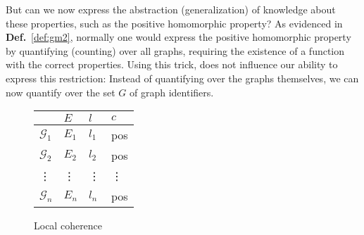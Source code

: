 \documentclass{article}
\theoremstyle{definition}
\newcommand{\graph}[1]{\ensuremath{\mathcal{#1}}}
\begin{document}

But can we now express the abstraction (generalization) of knowledge about these properties, such as the positive homomorphic property?
As evidenced in \textbf{Def.}~\ref{def:gm2}, normally one would express the positive homomorphic property by quantifying (counting) over all graphs, requiring the existence of a function with the correct properties.
Using this trick, does not influence our ability to express this restriction: Instead of quantifying over the graphs themselves, we can now quantify over the set $G$ of graph identifiers.

\begin{figure}[h]
\centering
\begin{tabular}{l |l l l}
         & $E$ & $l$      & $c$ \\
\hline
$\graph{G}_{1}$  & $E_{1}$ & $l_{1}$ & pos\\
$\graph{G}_{2}$  & $E_{2}$ & $l_{2}$ & pos\\
  \vdots & \vdots  & \vdots  & \vdots\\
$\graph{G}_{n}$  & $E_{n}$ & $l_{n}$ & pos\\
\end{tabular}
\caption{Local coherence\label{fig:LocalCoherence}}
\end{figure}


\end{document}
